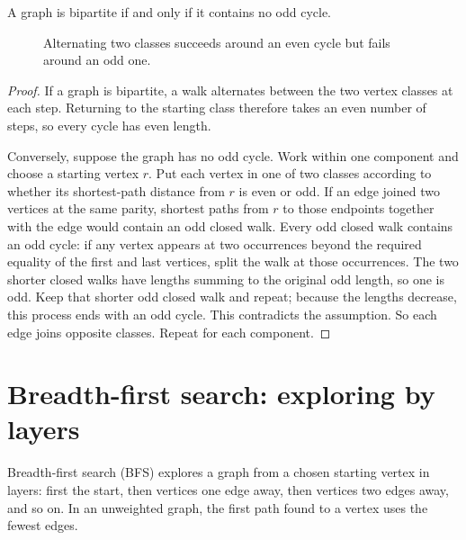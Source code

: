 \begin{theorem}
A graph is bipartite if and only if it contains no odd cycle.
\end{theorem}
\begin{figure}[htbp]
\centering
{}
\caption{Alternating two classes succeeds around an even cycle but fails around an odd one.}
\end{figure}
\begin{proof}
If a graph is bipartite, a walk alternates between the two vertex classes at each step. Returning to the starting class therefore takes an even number of steps, so every cycle has even length.

Conversely, suppose the graph has no odd cycle. Work within one component and choose a starting vertex $r$. Put each vertex in one of two classes according to whether its shortest-path distance from $r$ is even or odd. If an edge joined two vertices at the same parity, shortest paths from $r$ to those endpoints together with the edge would contain an odd closed walk. Every odd closed walk contains an odd cycle: if any vertex appears at two occurrences beyond the required equality of the first and last vertices, split the walk at those occurrences. The two shorter closed walks have lengths summing to the original odd length, so one is odd. Keep that shorter odd closed walk and repeat; because the lengths decrease, this process ends with an odd cycle. This contradicts the assumption. So each edge joins opposite classes. Repeat for each component.
\end{proof}

\section*{Breadth-first search: exploring by layers}
Breadth-first search (BFS) explores a graph from a chosen starting vertex in layers: first the start, then vertices one edge away, then vertices two edges away, and so on. In an unweighted graph, the first path found to a vertex uses the fewest edges.

